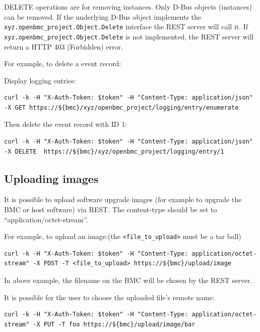 DELETE operations are for removing instances. Only D-Bus objects
(instances) can be removed. If the underlying D-Bus object implements
the \texttt{xyz.openbmc\_project.Object.Delete} interface the REST
server will call it. If \texttt{xyz.openbmc\_project.Object.Delete} is
not implemented, the REST server will return a HTTP 403 (Forbidden)
error.

For example, to delete a event record:

Display logging entries:

\begin{verbatim}
curl -k -H "X-Auth-Token: $token" -H "Content-Type: application/json" -X GET https://${bmc}/xyz/openbmc_project/logging/entry/enumerate
\end{verbatim}

Then delete the event record with ID 1:

\begin{verbatim}
curl -k -H "X-Auth-Token: $token" -H "Content-Type: application/json" -X DELETE  https://${bmc}/xyz/openbmc_project/logging/entry/1
\end{verbatim}

\hypertarget{uploading-images}{%
\subsection{Uploading images}\label{uploading-images}}

It is possible to upload software upgrade images (for example to upgrade
the BMC or host software) via REST. The content-type should be set to
``application/octet-stream''.

For example, to upload an image:(the
\texttt{\textless{}file\_to\_upload\textgreater{}} must be a tar ball)

\begin{verbatim}
curl -k -H "X-Auth-Token: $token" -H "Content-Type: application/octet-stream" -X POST -T <file_to_upload> https://${bmc}/upload/image
\end{verbatim}

In above example, the filename on the BMC will be chosen by the REST
server.

It is possible for the user to choose the uploaded file's remote name:

\begin{verbatim}
curl -k -H "X-Auth-Token: $token" -H "Content-Type: application/octet-stream" -X PUT -T foo https://${bmc}/upload/image/bar
\end{verbatim}

